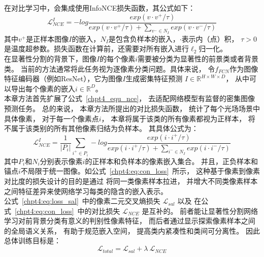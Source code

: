 在对比学习中，会集成使用InfoNCE损失函数，其公式如下：
\begin{equation}
	\mathcal{L} _{NCE}^{I}=-log \frac{exp(v \cdot v^{+ }/\tau )}
{exp(v \cdot v^{+}/\tau )+ \sum_{v^{-}\in N_{I}} exp(v \cdot v^{-}/\tau )} 
\label{chpt4_equ_nce}
\end{equation}
其中$v^{+}$是正样本图像$I$的嵌入，$N_{I}$是包含负样本的嵌入，$\cdot$表示内（点）积，
$\tau >0$是温度超参数。损失函数在计算前，还需要对所有嵌入进行$\ell_{2}$归一化。\\
% 
% 
% 
% 
\indent
在显著性分割的背景下，图像$I$的每个像素$i$需要被分类为显著性的前景类或者背景类。
当前的方法通常将此任务视为逐像素分类问题。具体来说，
令$f_{FCN}$作为图像特征编码器（例如ResNet），它为图像$I$生成密集特征预测
$I\in \mathbb{R}^{ H \times W \times D}$，
从中可以导出每个像素的嵌入$i \in  \mathbb{R}^{D}$。\\
%
%
%
%
\indent 
本章方法首先扩展了公式~\ref{chpt4_equ_nce}，
去适配网络模型有监督的密集图像预测任务。
总的来说，
本章方法所提出的对比损失函数，
统计了每个光场场景中具体像素，
对于每一个像素点$i$，
本章将属于该类的所有像素都视为正样本，
将不属于该类别的所有其他像素归结为负样本。
其具体公式为：
\begin{equation}
	\mathcal{L} _{NCE}^{I}= 
	\frac{1}{|P_{i}|}
	\sum_{i^{+}\in P_{i}}^{}  
	-log \frac
	{exp(i \cdot i^{+ }/\tau )}
	{exp(i \cdot i^{+}/\tau )+ \sum_{i^{-}\in N_{I}} exp(i \cdot i^{-}/\tau )} 
	\label{chpt4:eq:con_loss}
\end{equation}
其中$P_{i}$和$N_{i}$分别表示像素$i$的正样本和负样本的像素嵌入集合。
并且，正负样本和锚点$i$不局限于统一图像。如公式~\ref{chpt4:eq:con_loss}~所示，
这种基于像素到像素对比度的损失设计的目的是通过
将同一类像素样本拉进，
并增大不同类像素样本之间特征差异来使网络学习每类的隐含的嵌入表示。\\
%
%
%
%
\indent 
公式~\ref{chpt4:eq:loss_sal}~中的像素二元交叉熵损失
$\mathcal{L}_{sal} $
以及
在公式~\ref{chpt4:eq:con_loss}~中的对比损失
$\mathcal{L}_{NCE} $
是互补的。
前者能让显著性分割网络学习对前背景分类有意义的判别性像素特征，
而后者通过显示探索像素样本之间的全局语义关系，
有助于规范嵌入空间，
提高类内紧凑性和类间可分离性。
因此总体训练目标是：
%
%
%
%
\begin{equation}
	\mathcal{L}_{total} =  \mathcal{L}_{sal}+ \lambda  ~ \mathcal{L}_{NCE}
\end{equation}
%
%
%
%
